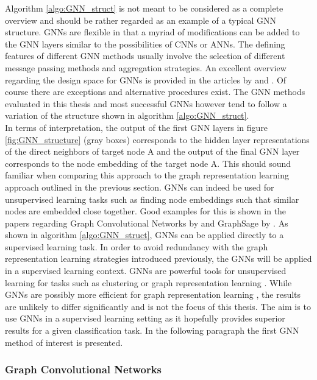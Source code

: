 	\noindent Algorithm \ref{algo:GNN_struct} is not meant to be considered as
	a complete overview and should be rather regarded as an example of a typical 
	GNN structure. GNNs are flexible in that a myriad of modifications can be 
	added to the GNN layers similar to the possibilities of CNNs or ANNs. The 
	defining features of different GNN methods usually involve the selection of 
	different message passing methods and aggregation strategies. An excellent 
	overview regarding the design space for GNNs is provided in the articles by
	\cite{you2020design} and \cite{zhou2020graph}.
	Of course there are exceptions and alternative procedures exist. The GNN 
	methods evaluated in this thesis and most successful GNNs however tend to 
	follow a variation of the structure shown in algorithm 
	\ref{algo:GNN_struct}.  \\

	\noindent In terms of interpretation, the output of the first GNN layers in
	figure \ref{fig:GNN_structure} (gray boxes) corresponds to the hidden layer 
	representations of the direct neighbors of target node A and the output of 
	the final GNN layer corresponds to the node embedding of the target node A. 
	This should sound familiar when comparing this approach to the graph 
	representation learning approach outlined in the previous section. 
	GNNs can indeed be used for unsupervised learning tasks such as finding node 
	embeddings such that similar nodes are embedded close together. Good
	examples for this is shown in the papers regarding Graph Convolutional
	Networks by \cite{kipf2016semi} and GraphSage by
	\cite{hamilton2017inductive}. As shown in algorithm \ref{algo:GNN_struct},
	GNNs can be applied directly to a supervised learning task. In order to
	avoid redundancy with the graph representation learning strategies
	introduced previously, the GNNs will be applied in a supervised learning
	context. GNNs are powerful tools for unsupervised learning for tasks such
	as clustering or graph representation learning \citep{zhou2020graph}. While
	GNNs are possibly more efficient for graph representation learning 
	\citep[p. 12-13]{kipf2016semi}, the results are unlikely to differ 
	significantly and is not the focus of this thesis. The aim is to use GNNs
	in a supervised learning setting as it hopefully provides superior results
	for a given classification task. In the following paragraph the first GNN 
	method of interest is presented. 


	\subsubsection{Graph Convolutional Networks}
	
